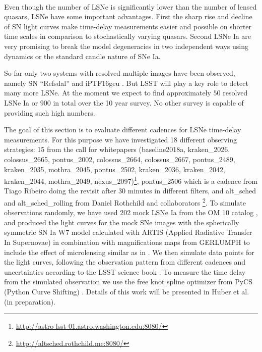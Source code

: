 \

Even though the number of LSNe is significantly lower than the number of
lensed quasars, LSNe have some important advantages. First 
the sharp rise
and decline of SN light curves make time-delay measurements easier and possible
on shorter time scales in comparison to stochastically varying quasars. Second LSNe Ia are very promising
to break the model degeneracies \citep{Schneider:2013wga} in two
independent ways using dynamics \citep{Barnabe2011,2017:Yildirim} or
the standard candle nature of SNe Ia.  

So far only two systems with resolved
multiple images have been observed, namely SN ``Refsdal''
\citep{Kelly:2015xvu,Kelly:2015vjq} and iPTF16geu
\citep{Goobar:2016uuf}. But LSST will play a key role to detect many
more LSNe. At the moment we expect to find approximately $50$ resolved
LSNe Ia \citep{Oguri:2010} or $900$ in total \citep{Goldstein:2017bny}
over the 10 year survey. No other survey is capable of providing such
high numbers.

The goal of this section is to evaluate different
cadences for LSNe time-delay measurements. For this purpose we have investigated
18 different observing strategies: 15 from the call for whitepapers
(baseline2018a, kraken\_2026, colossus\_2665, pontus\_2002,
colossus\_2664, colossus\_2667, pontus\_2489, kraken\_2035,
mothra\_2045, pontus\_2502,
kraken\_2036, kraken\_2042, kraken\_2044, mothra\_2049, nexus\_2097)\footnote{\url{http://astro-lsst-01.astro.washington.edu:8080/}},
pontus\_2506 which is a cadence from Tiago Ribeiro doing the revisit
after 30 minutes in different filters, and alt\_sched and
alt\_sched\_rolling from Daniel Rothchild and collaborators
\footnote{\url{http://altsched.rothchild.me:8080/}}. 
To simulate observations randomly, we have used 202
mock LSNe Ia from the OM 10 catalog \citep{Oguri:2010},
and produced the light curves for the mock SNe images with
the spherically symmetric SN Ia W7 model \citep{1984:Nomoto}
calculated with ARTIS (Applied Radiative Transfer In Supernovae)
\citep{Kromer:2009ce} in combination with magnifications maps from
GERLUMPH \citep{Vernardos:2015wta} to include the effect of
microlensing similar as in \citep{Goldstein:2017bny}. We then simulate
data points for the light curves, following the observation pattern from different cadences
and uncertainties according to the LSST science book
\citep{2009:LSSTscience}. To measure the time delay from the simulated
observation we use the free knot spline optimizer from PyCS (Python
Curve Shifting) \citep{2013:Tewesb,Bonvin:2015jia}. Details of this
work will be presented in Huber et al. (in preparation).


